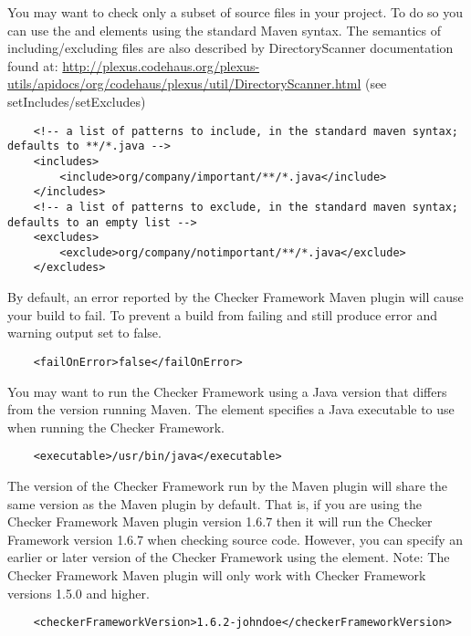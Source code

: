 \begin{enumerate}
You may want to check only a subset of source files in your project.  To do so you can use the  and 
elements using the standard Maven syntax.  The semantics of including/excluding files are also described
by DirectoryScanner documentation found at:
\url{http://plexus.codehaus.org/plexus-utils/apidocs/org/codehaus/plexus/util/DirectoryScanner.html} (see setIncludes/setExcludes)

\begin{Verbatim}
    <!-- a list of patterns to include, in the standard maven syntax; defaults to **/*.java -->
    <includes>
        <include>org/company/important/**/*.java</include>
    </includes>
    <!-- a list of patterns to exclude, in the standard maven syntax; defaults to an empty list -->
    <excludes>
        <exclude>org/company/notimportant/**/*.java</exclude>
    </excludes>
\end{Verbatim}

By default, an error reported by the Checker Framework Maven plugin will cause your build to fail.  To prevent
a build from failing and still produce error and warning output set  to false.

\begin{Verbatim}
    <failOnError>false</failOnError>
\end{Verbatim}

You may want to run the Checker Framework using a Java version that differs from the version running Maven.  The
 element specifies a Java executable to use when running the Checker Framework.

\begin{Verbatim}
    <executable>/usr/bin/java</executable>
\end{Verbatim}

The version of the Checker Framework run by the Maven plugin will share the same version as the Maven plugin
by default.  That is, if you are using the Checker Framework Maven plugin version 1.6.7 then it will run the
Checker Framework version 1.6.7 when checking source code.  However, you can specify an earlier
or later version of the Checker Framework using the  element.
Note: The Checker Framework Maven plugin will only work with Checker Framework versions 1.5.0 and higher.

\begin{Verbatim}
    <checkerFrameworkVersion>1.6.2-johndoe</checkerFrameworkVersion>
\end{Verbatim}


\end{enumerate}
